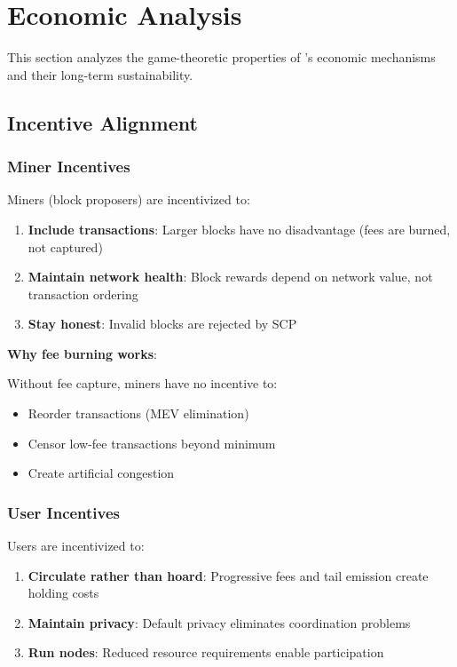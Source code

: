 
\section{Economic Analysis}
\label{sec:economics}

This section analyzes the game-theoretic properties of \Botho's economic
mechanisms and their long-term sustainability.

\subsection{Incentive Alignment}

\subsubsection{Miner Incentives}

Miners (block proposers) are incentivized to:

\begin{enumerate}
  \item \textbf{Include transactions}: Larger blocks have no disadvantage
    (fees are burned, not captured)
  \item \textbf{Maintain network health}: Block rewards depend on network
    value, not transaction ordering
  \item \textbf{Stay honest}: Invalid blocks are rejected by SCP
\end{enumerate}

\textbf{Why fee burning works}:

Without fee capture, miners have no incentive to:
\begin{itemize}
  \item Reorder transactions (MEV elimination)
  \item Censor low-fee transactions beyond minimum
  \item Create artificial congestion
\end{itemize}

\subsubsection{User Incentives}

Users are incentivized to:

\begin{enumerate}
  \item \textbf{Circulate rather than hoard}: Progressive fees and tail
    emission create holding costs
  \item \textbf{Maintain privacy}: Default privacy eliminates coordination
    problems
  \item \textbf{Run nodes}: Reduced resource requirements enable
    participation
\end{enumerate}

